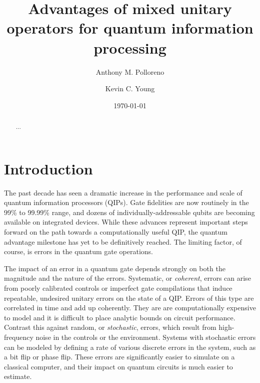 \documentclass[aps,nofootinbib,pra,notitlepage,twocolumn]{revtex4-1}
\begin{document}
\title{Advantages of mixed unitary operators for quantum information processing}

\author{Anthony M. Polloreno}

\author{Kevin C. Young}

\date{\today}

\begin{abstract}
...
\end{abstract}

\pacs{}

\maketitle


\section{Introduction}
\label{sec:introduction}

The past decade has seen a dramatic increase in the performance and scale of quantum information processors (QIPs). Gate fidelities are now routinely in the 99\% to 99.99\% range, and dozens of individually-addressable qubits are becoming available on integrated devices. While these advances represent important steps forward on the path towards a computationally useful QIP, the quantum advantage milestone has yet to be definitively reached. The limiting factor, of course, is errors in the quantum gate operations.

The impact of an error in a quantum gate depends strongly on both the magnitude and the nature of the errors. Systematic, or \emph{coherent}, errors can arise from poorly calibrated controls or imperfect gate compilations that induce repeatable, undesired unitary errors on the state of a QIP. Errors of this type are correlated in time and add up coherently. They are are  computationally expensive to model and it is difficult to place analytic bounds on circuit performance. Contrast this against random, or \emph{stochastic}, errors, which result from high-frequency noise in the controls or the environment. Systems with stochastic errors can be  modeled by defining a rate of various discrete errors in the system, such as a bit flip or phase flip. These errors are significantly easier to simulate on a classical computer, and their impact on quantum circuits is much easier to estimate.
\end{document}
